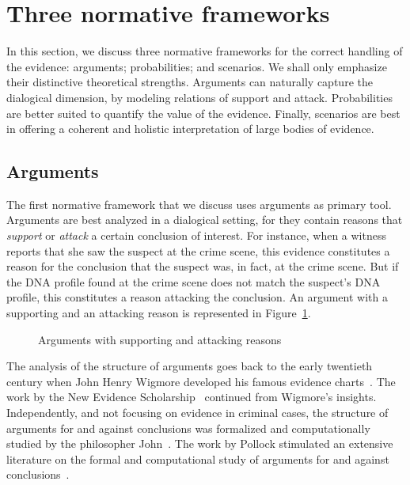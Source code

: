 \documentclass[10pt]{article}
\begin{document}
\section{Three normative frameworks}
\label{sec:frameworks}

In this section, we discuss three normative frameworks for the correct handling of the evidence: 
arguments; probabilities; and scenarios. %
We shall only emphasize their distinctive theoretical strengths. Arguments can naturally 
capture the dialogical dimension, by modeling relations of support and attack. 
Probabilities are better suited to quantify the value of the evidence. Finally, scenarios are 
best in offering a coherent and holistic interpretation 
of large bodies of evidence. 


\subsection{Arguments}

The first normative framework %
that we discuss uses arguments as primary tool. 
Arguments are best analyzed in a dialogical setting, for they 
contain reasons that \textit{support} or \textit{attack} a certain conclusion of interest. For instance, when a witness reports that 
she saw the suspect at the crime scene, this evidence constitutes a reason for the conclusion that 
the suspect was, in fact, at the crime scene. But if the DNA profile found at the crime scene 
does not match the suspect's DNA profile, this constitutes 
a reason attacking the conclusion. An argument with a supporting and 
an attacking reason is represented in Figure~\ref{fig:arg}.

\begin{figure}[bt]
\centering

\caption{Arguments with supporting and attacking reasons\label{fig:arg}}
\end{figure}


The analysis of the structure of arguments goes back to the early twentieth century when John Henry Wigmore developed his famous evidence charts~\citep{wigmore1913,wigmore1931}. The work by the New Evidence Scholarship~\citep{andersonEtal2005} continued from Wigmore's insights. Independently, and not focusing on evidence in criminal cases, the structure of arguments for and against conclusions was formalized and computationally studied by the philosopher John~\citet{pollock1987,pollock1995}. The work by Pollock stimulated an extensive literature on the formal and computational study of arguments for and against conclusions~\citep{vanEemerenEtal2014Ch11}.
\end{document}
